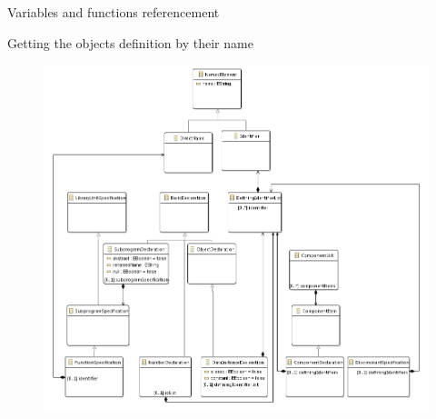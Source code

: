 \documentclass[a4paper]{prjdoc}
\begin{document}
\begin{asection}{Variables and functions referencement}
\begin{asection}{Getting the objects definition by their name}
        \begin{figure}
        \includegraphics[scale=0.59]{"../../model/Data and Functions"}
        \label{fig:DataandFunctions}
        \end{figure}          
     
     \end{asection} %

  \end{asection} %
    
\end{document}
